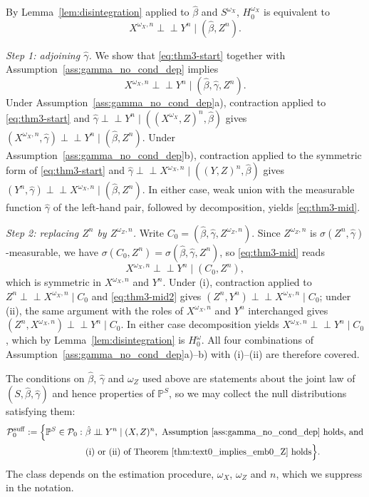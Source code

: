 \documentclass[twoside,11pt]{article}
\newcommand{\indep}{\perp \!\!\! \perp}
\begin{document}
\begin{proofE}
By Lemma~\ref{lem:disintegration} applied to $\hat\beta$ and $S^{\omega_X}$, $H^{\omega_X}_0$ is equivalent to
\begin{equation}\label{eq:thm3-start}
  X^{\omega_X,n}\indep Y^n\mid(\hat\beta,Z^n).
\end{equation}

\emph{Step 1: adjoining $\hat\gamma$.} We show that \eqref{eq:thm3-start} together with
Assumption~\ref{ass:gamma_no_cond_dep} implies
\begin{equation}\label{eq:thm3-mid}
  X^{\omega_X,n}\indep Y^n\mid(\hat\beta,\hat\gamma,Z^n).
\end{equation}
Under Assumption~\ref{ass:gamma_no_cond_dep}a), contraction applied to \eqref{eq:thm3-start} and
$\hat\gamma\indep Y^n\mid((X^{\omega_X},Z)^n,\hat\beta)$ gives
$(X^{\omega_X,n},\hat\gamma)\indep Y^n\mid(\hat\beta,Z^n)$. Under
Assumption~\ref{ass:gamma_no_cond_dep}b), contraction applied to the symmetric form of \eqref{eq:thm3-start} and
$\hat\gamma\indep X^{\omega_X,n}\mid((Y,Z)^n,\hat\beta)$ gives
$(Y^n,\hat\gamma)\indep X^{\omega_X,n}\mid(\hat\beta,Z^n)$. In either case, weak union with the
measurable function $\hat\gamma$ of the left-hand pair, followed by decomposition, yields
\eqref{eq:thm3-mid}.

\emph{Step 2: replacing $Z^n$ by $Z^{\omega_Z,n}$.} Write $C_0=(\hat\beta,\hat\gamma,Z^{\omega_Z,n})$.
Since $Z^{\omega_Z,n}$ is $\sigma(Z^n,\hat\gamma)$-measurable, we have
$\sigma(C_0,Z^n)=\sigma(\hat\beta,\hat\gamma,Z^n)$, so \eqref{eq:thm3-mid} reads
\begin{equation}\label{eq:thm3-mid2}
  X^{\omega_X,n}\indep Y^n\mid(C_0,Z^n),
\end{equation}
which is symmetric in $X^{\omega_X,n}$ and $Y^n$. Under (i), contraction applied to
$Z^n\indep X^{\omega_X,n}\mid C_0$ and \eqref{eq:thm3-mid2} gives
$(Z^n,Y^n)\indep X^{\omega_X,n}\mid C_0$; under (ii), the same argument with the roles of
$X^{\omega_X,n}$ and $Y^n$ interchanged gives $(Z^n,X^{\omega_X,n})\indep Y^n\mid C_0$. In
either case decomposition yields $X^{\omega_X,n}\indep Y^n\mid C_0$, which by
Lemma~\ref{lem:disintegration} is $H^{\omega}_0$. All four combinations of
Assumption~\ref{ass:gamma_no_cond_dep}a)--b) with (i)--(ii) are therefore covered.
\end{proofE}
The conditions on $\hat\beta$, $\hat\gamma$ and $\omega_Z$ used above are statements about the joint law of $(S,\hat\beta,\hat\gamma)$ and hence properties of $\mathbb{P}^S$, so we may collect the null distributions satisfying them:
\begin{align*}
\mathcal{P}_0^{\mathrm{suff}} := \Big\{\mathbb{P}^S\in\mathcal{P}_0 :\
&\hat\beta\indep Y^n\mid (X,Z)^n,\ \text{Assumption~\ref{ass:gamma_no_cond_dep} holds, and}\\
&\text{(i) or (ii) of Theorem~\ref{thm:text0_implies_emb0_Z} holds}\Big\}.
\end{align*}
The class depends on the estimation procedure, $\omega_X$, $\omega_Z$ and $n$, which we suppress in the notation.
\end{document}
